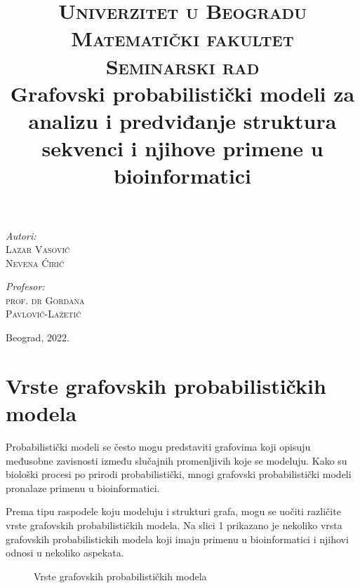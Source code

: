 \documentclass[a4paper, 12pt]{article}
\title{\textsc{Univerzitet u Beogradu \\ Matematički fakultet} \\ \vspace{2cm} {\small \textsc{Seminarski rad}} \\ \vspace{0.3cm} Grafovski probabilistički modeli za analizu i predviđanje struktura sekvenci i njihove primene u bioinformatici \\}
\date{}
\begin{document}
\maketitle
\thispagestyle{empty}

\vspace{8cm}

\begin{minipage}[t]{5cm}
\textit{Autori:} \\
\textsc{Lazar Vasović}\\
\textsc{Nevena Ćirić}\\
\end{minipage}
\hfill
\begin{minipage}[t]{5cm}
\hfill  \textit{Profesor:} \\
\hfill  \textsc{prof. dr Gordana}\\
\hfill  \textsc{Pavlović-Lažetić} \\
\end{minipage}

\vspace{2cm}

\begin{center}
Beograd, 2022.
\end{center}

\newpage

\section{Vrste grafovskih probabilističkih modela}

Probabilistički modeli se često mogu predstaviti grafovima koji opisuju međusobne zavisnosti između slučajnih promenljivih koje se modeluju. Kako su biološki procesi po prirodi probabilistički, mnogi grafovski probabilistički modeli pronalaze primenu u bioinformatici.

Prema tipu raspodele koju modeluju i strukturi grafa, mogu se uočiti različite vrste grafovskih probabilističkih modela. Na slici 1 prikazano je nekoliko vrsta grafovskih probabilistickih modela koji imaju primenu u bioinformatici i njihovi odnosi u nekoliko aspekata.

\begin{figure}[h!]
    \centering
    \vspace{0.3cm}
    \vspace{0.15cm}
    \caption{Vrste grafovskih probabilističkih modela}
    \vspace{0.3cm}
\end{figure}
\end{document}
